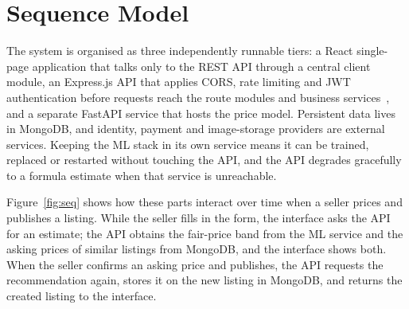 \documentclass[11pt,letterpaper,oneside]{report}
\begin{document}
\section{Sequence Model}
The system is organised as three independently runnable tiers: a React single-page application
that talks only to the REST API through a central client module, an Express.js API that applies
CORS, rate limiting and JWT authentication before requests reach the route modules and business
services~\cite{fielding}, and a separate FastAPI service that hosts the price model. Persistent data lives
in MongoDB, and identity, payment and image-storage providers are external services. Keeping the
ML stack in its own service means it can be trained, replaced or restarted without touching the API,
and the API degrades gracefully to a formula estimate when that service is unreachable.

Figure~\ref{fig:seq} shows how these parts interact over time when a seller prices and publishes a
listing. While the seller fills in the form, the interface asks the API for an estimate; the API
obtains the fair-price band from the ML service and the asking prices of similar listings from
MongoDB, and the interface shows both. When the seller confirms an asking price and publishes,
the API requests the recommendation again, stores it on the new listing in MongoDB, and returns
the created listing to the interface.
\end{document}
